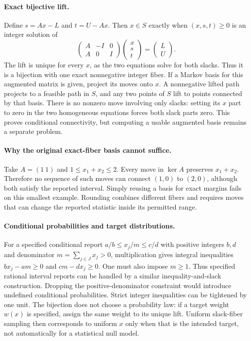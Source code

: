 \documentclass[11pt]{article}
\begin{document}
\paragraph{Exact bijective lift.}
Define $s=Ax-L$ and $t=U-Ax$. Then $x\in S$ exactly when
$(x,s,t)\ge0$ is an integer solution of
\[
\begin{pmatrix}A&-I&0\\A&0&I\end{pmatrix}
\begin{pmatrix}x\\s\\t\end{pmatrix}
=\begin{pmatrix}L\\U\end{pmatrix}.
\]
The lift is unique for every $x$, as the two equations solve for both
slacks. Thus it is a bijection with one exact nonnegative integer fiber.
If a Markov basis for this augmented matrix is given, project its moves
onto $x$. A nonnegative lifted path projects to a feasible path in $S$,
and any two points of $S$ lift to points connected by that basis.
There is no nonzero move involving only slacks: setting its $x$ part
to zero in the two homogeneous equations forces both slack parts zero.
This proves conditional connectivity, but computing a usable augmented
basis remains a separate problem.

\paragraph{Why the original exact-fiber basis cannot suffice.}
Take $A=(1\ 1)$ and $1\le x_1+x_2\le2$. Every move in $\ker A$
preserves $x_1+x_2$. Therefore no sequence of such moves can connect
$(1,0)$ to $(2,0)$, although both satisfy the reported interval.
Simply reusing a basis for exact margins fails on this smallest example.
Rounding combines different fibers and requires moves that can change
the reported statistic inside its permitted range.

\paragraph{Conditional probabilities and target distributions.}
For a specified conditional report $a/b\le x_j/m\le c/d$ with positive
integers $b,d$ and denominator $m=\sum_{j\in J}x_j>0$, multiplication
gives integral inequalities $bx_j-am\ge0$ and $cm-dx_j\ge0$.
One must also impose $m\ge1$. Thus specified rational interval reports
can be handled by a similar inequality-and-slack construction. Dropping
the positive-denominator constraint would introduce undefined conditional
probabilities. Strict integer inequalities can be tightened by one unit.
The bijection does not choose a probability law: if a target weight
$w(x)$ is specified, assign the same weight to its unique lift. Uniform
slack-fiber sampling then corresponds to uniform $x$ only when that is
the intended target, not automatically for a statistical null model.
\end{document}
